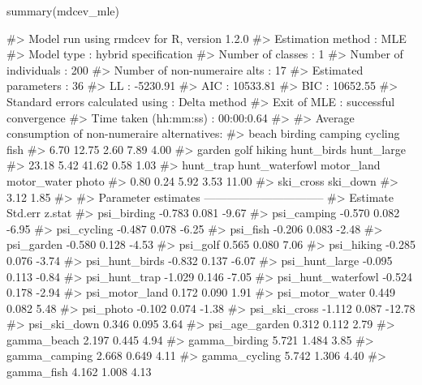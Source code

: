 \begin{Schunk}
\begin{Sinput}
summary(mdcev_mle)
\end{Sinput}
\begin{Soutput}
#> Model run using rmdcev for R, version 1.2.0 
#> Estimation method                : MLE
#> Model type                       : hybrid specification
#> Number of classes                : 1
#> Number of individuals            : 200
#> Number of non-numeraire alts     : 17
#> Estimated parameters             : 36
#> LL                               : -5230.91
#> AIC                              : 10533.81
#> BIC                              : 10652.55
#> Standard errors calculated using : Delta method
#> Exit of MLE                      : successful convergence
#> Time taken (hh:mm:ss)            : 00:00:0.64
#> 
#> Average consumption of non-numeraire alternatives:
#>          beach        birding        camping        cycling           fish 
#>           6.70          12.75           2.60           7.89           4.00 
#>         garden           golf         hiking     hunt_birds     hunt_large 
#>          23.18           5.42          41.62           0.58           1.03 
#>      hunt_trap hunt_waterfowl     motor_land    motor_water          photo 
#>           0.80           0.24           5.92           3.53          11.00 
#>      ski_cross       ski_down 
#>           3.12           1.85 
#> 
#> Parameter estimates --------------------------------  
#>                      Estimate Std.err z.stat
#> psi_birding            -0.783   0.081  -9.67
#> psi_camping            -0.570   0.082  -6.95
#> psi_cycling            -0.487   0.078  -6.25
#> psi_fish               -0.206   0.083  -2.48
#> psi_garden             -0.580   0.128  -4.53
#> psi_golf                0.565   0.080   7.06
#> psi_hiking             -0.285   0.076  -3.74
#> psi_hunt_birds         -0.832   0.137  -6.07
#> psi_hunt_large         -0.095   0.113  -0.84
#> psi_hunt_trap          -1.029   0.146  -7.05
#> psi_hunt_waterfowl     -0.524   0.178  -2.94
#> psi_motor_land          0.172   0.090   1.91
#> psi_motor_water         0.449   0.082   5.48
#> psi_photo              -0.102   0.074  -1.38
#> psi_ski_cross          -1.112   0.087 -12.78
#> psi_ski_down            0.346   0.095   3.64
#> psi_age_garden          0.312   0.112   2.79
#> gamma_beach             2.197   0.445   4.94
#> gamma_birding           5.721   1.484   3.85
#> gamma_camping           2.668   0.649   4.11
#> gamma_cycling           5.742   1.306   4.40
#> gamma_fish              4.162   1.008   4.13

\end{Soutput}
\end{Schunk}
